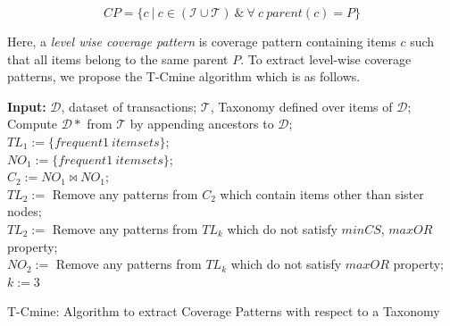 \begin{equation}
CP = \{c\ |\ c \in  (\mathcal{I} \cup \mathcal{T}) \ \&\ \forall\ c\ parent(c) = P \} \label{eq:CP2}
\end{equation}

Here, a \textit{level wise coverage pattern} is coverage pattern containing items $c$ such that all items belong to the same parent $P$. To extract level-wise coverage patterns, we propose the T-Cmine algorithm which is as follows.


\begin{algorithm}
 \textbf{Input:} $\mathcal{D}$, dataset of transactions; $\mathcal{T}$, Taxonomy defined over items of $\mathcal{D}$;\\
 \SetAlgoLined
 Compute $\mathcal{D*}$ from $\mathcal{T}$ by appending ancestors to $\mathcal{D}$;\\
 $TL_{1} := \{frequent 1\ itemsets\} $;\\
 $NO_{1} := \{frequent 1\ itemsets\} $;\\
 $C_{2} := NO_{1} \Join NO_{1}$;\\
 $TL_{2} :=$ Remove any patterns from $C_{2}$ which contain items other than sister nodes;\\
 $TL_{2} := $ Remove any patterns from $TL_{k}$ which do not satisfy $minCS$, $maxOR$ property;\\
  $NO_{2}:=$ Remove any patterns from $TL_{k}$ which do not satisfy $maxOR$ property; \\
 $k := 3$\\
 \caption{T-Cmine: Algorithm to extract Coverage Patterns with respect to a Taxonomy}
\end{algorithm}


